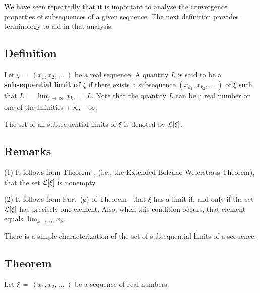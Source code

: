 \V
\V

        We have seen repeatedly that it is important to analyse the convergence properties of subsequences of a given sequence.
    The next definition provides terminology to aid in that analysis.

            \subsection{\small{\bf Definition}}
            \label{DefC50.80}

        Let ${\xi} \,=\, (x_{1},x_{2},\,{\ldots}\,)$ be a real sequence. A quantity $L$ is said to be a {\bf subsequential limit of ${\xi}$} if there exists a subsequence $(x_{k_{1}},x_{k_{2}},\,{\ldots}\,)$ of ${\xi}$ such that $L \,=\, \lim_{j \,{\rightarrow}\,{\infty}} x_{k_{j}} \,=\, L$.
    Note that the quantity $L$ can be a real number or one of the infinities $+{\infty}$, $-{\infty}$.

        The set of all subsequential limits of ${\xi}$ is denoted by ${\cal L}[{\xi}]$.

\V

            \subsection{\small{\bf Remarks}}
            \label{RemrkC50.90}


        (1) It follows from Theorem~, (i.e., the Extended Bolzano-Weierstrass Theorem), that the set ${\cal L}[{\xi}]$ is nonempty.

\V

        (2) It follows from Part~(g) of Theorem~ that ${\xi}$ has a limit if, and only if the set ${\cal L}[{\xi}]$ has precisely one element.
    Also, when this condition occurs, that element equals $\lim_{k \,{\rightarrow}\, {\infty}} x_{k}$.

\V

        There is a simple characterization of the set of subsequential limits of a sequence.

\V


            \subsection{\small{\bf Theorem}}
            \label{ThmC50.100}

        Let ${\xi} \,=\, (x_{1},x_{2},\,{\ldots}\,)$ be a sequence of real numbers.


